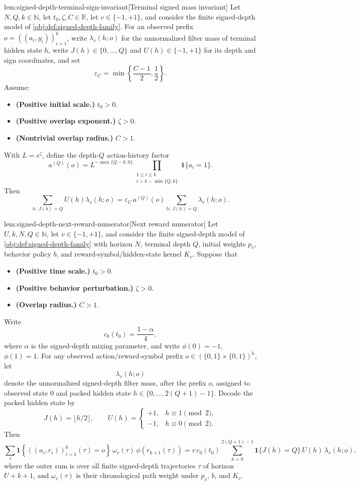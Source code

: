\begin{lemmav}{lem:signed-depth-terminal-sign-invariant}[Terminal signed mass invariant]
Let \(N,Q,k\in\mathbb N\), let \(t_0,\zeta,C\in\mathbb R\), let \(v\in\{-1,+1\}\), and consider the finite signed-depth model of \cref{obj:def:signed-depth-family}.  For an observed prefix \(o=((a_i,y_i))_{i=1}^k\), write \(\lambda_v(h;o)\) for the unnormalized filter mass of terminal hidden state \(h\), write \(J(h)\in\{0,\ldots,Q\}\) and \(U(h)\in\{-1,+1\}\) for its depth and sign coordinates, and set
\[
\varepsilon_C=\min\left\{\frac{C-1}{2},\frac12\right\}.
\]
Assume:
\begin{itemize}
\item \textbf{(Positive initial scale.)} \(t_0>0\).
\item \textbf{(Positive overlap exponent.)} \(\zeta>0\).
\item \textbf{(Nontrivial overlap radius.)} \(C>1\).
\end{itemize}
With \(L=e^\zeta\), define the depth-\(Q\) action-history factor
\[
a^{(Q)}(o)
=
L^{-\max\{Q-k,0\}}
\prod_{\substack{1\le i\le k\\ i>k-\min\{Q,k\}}}
\mathbf 1\{a_i=1\}.
\]
Then
\[
\sum_{h:\,J(h)=Q} U(h)\lambda_v(h;o)
=
\varepsilon_C\,a^{(Q)}(o)
\sum_{h:\,J(h)=Q}\lambda_v(h;o).
\]
\end{lemmav}

\begin{lemmav}{lem:signed-depth-next-reward-numerator}[Next reward numerator]
Let \(U,k,N,Q\in\mathbb N\), let \(v\in\{-1,+1\}\), and consider the finite signed-depth model of \cref{obj:def:signed-depth-family} with horizon \(N\), terminal depth \(Q\), initial weights \(p_v\), behavior policy \(b\), and reward-symbol/hidden-state kernel \(K_v\). Suppose that
\begin{itemize}
\item \textbf{(Positive time scale.)} \(t_0>0\).
\item \textbf{(Positive behavior perturbation.)} \(\zeta>0\).
\item \textbf{(Overlap radius.)} \(C>1\).
\end{itemize}
Write
\[
c_0(t_0)=\frac{1-\alpha}{4},
\]
where \(\alpha\) is the signed-depth mixing parameter, and write \(\phi(0)=-1\), \(\phi(1)=1\).  For any observed action/reward-symbol prefix \(o\in(\{0,1\}\times\{0,1\})^k\), let
\[
\lambda_v(h;o)
\]
denote the unnormalized signed-depth filter mass, after the prefix \(o\), assigned to observed state \(0\) and packed hidden state \(h\in\{0,\ldots,2(Q+1)-1\}\).  Decode the packed hidden state by
\[
J(h)=\bigl\lfloor h/2\bigr\rfloor,
\qquad
U(h)=
\begin{cases}
+1, & h \equiv 1 \pmod 2,\\
-1, & h \equiv 0 \pmod 2.
\end{cases}
\]
Then
\[
\sum_{\tau}
\mathbf 1\!\left\{ ((a_i,r_i))_{i=1}^k(\tau)=o\right\}
\,\omega_v(\tau)\,\phi\!\left(r_{k+1}(\tau)\right)
=
v\,c_0(t_0)
\sum_{h=0}^{2(Q+1)-1}
\mathbf 1\{J(h)=Q\}\,U(h)\,\lambda_v(h;o),
\]
where the outer sum is over all finite signed-depth trajectories \(\tau\) of horizon \(U+k+1\), and \(\omega_v(\tau)\) is their chronological path weight under \(p_v\), \(b\), and \(K_v\).
\end{lemmav}

